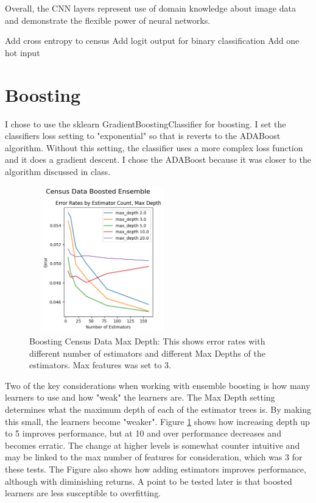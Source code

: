\documentclass[letterpaper]{article} %
\begin{document}
Overall, the CNN layers represent use of domain knowledge about image data and demonstrate the flexible power of neural networks.  

Add cross entropy to census
Add logit output for binary classification
Add one hot input

\section{Boosting}
I chose to use the sklearn GradientBoostingClassifier for boosting.  I set the classifiers loss setting to "exponential" so that is reverts to the ADABoost algorithm. Without this setting, the classifier uses a more complex loss function and it does a gradient descent.  I chose the ADABoost because it was closer to the algorithm discussed in class.

\begin{figure}[htb]
\centering
\includegraphics[width=2.5in, height=2.5in]{figures/Census_Data_Boosting_Estimator_Count_by_Max_Depth_boosting_1.png}
\caption{Boosting Census Data Max Depth:  This shows error rates with different number of estimators and different Max Depths of the estimators.  Max features was set to 3. }
\label{fig:boosting_census_1}
\end{figure}

Two of the key considerations when working with ensemble boosting is how many learners to use and how "weak" the learners are.  The Max Depth setting determines what the maximum depth of each of the estimator trees is.  By making this small, the learners become "weaker". Figure \ref{fig:boosting_census_1} shows how increasing depth up to 5 improves performance, but at 10 and over performance decreases and becomes erratic.  The change at higher levels is somewhat counter intuitive and may be linked to the max number of features for consideration, which was 3 for these tests.  The Figure also shows how adding estimators improves performance, although with diminishing returns.  A point to be tested later is that boosted learners are less susceptible to overfitting.
\end{document}

